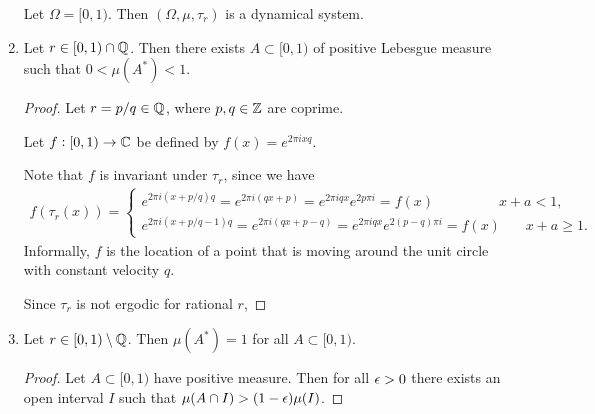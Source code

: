 \begin{enumerate}
    Let $\Omega = [0, 1)$. Then $(\Omega, \mu, \tau_r)$ is a dynamical system.


\item
  \begin{claim*}
    Let $r \in [0, 1) \cap \mathbb{Q}$. Then there exists $A \subset [0, 1)$ of positive Lebesgue measure such that $0 < \mu(A^*) < 1$.
  \end{claim*}
  \begin{proof}
    Let $r = p/q \in \mathbb{Q}$, where $p, q \in \mathbb{Z}$ are coprime.

    Let $f:[0, 1) \to \mathbb{C}$ be defined by $f(x) = e^{2\pi ixq}$.

    Note that $f$ is invariant under $\tau_r$, since we have
    \begin{align*}
      f(\tau_r(x)) =
      \begin{cases}
        e^{2\pi i (x + p/q)q} = e^{2\pi i (qx + p)} = e^{2\pi iqx}e^{2p\pi i} = f(x)  ~~~~~~~~~~~~~~~~~~~~~x + a < 1, \\
        e^{2\pi i (x + p/q - 1)q} = e^{2\pi i (qx + p - q)} = e^{2\pi iqx}e^{2(p - q)\pi i} = f(x)  ~~~~~~~~x + a \geq 1.
      \end{cases}
    \end{align*}
    Informally, $f$ is the location of a point that is moving around the unit circle with constant
    velocity $q$.

    Since $\tau_r$ is not ergodic for rational $r$,

  \end{proof}

\item
  \begin{claim*}
    Let $r \in [0, 1) \setminus \mathbb{Q}$. Then $\mu(A^*) = 1$ for all $A \subset [0, 1)$.
  \end{claim*}
  \begin{proof}

    Let $A \subset [0, 1)$ have positive measure. Then for all $\epsilon > 0$ there exists an open interval $I$
    such that $\mu(A \cap I) > (1 - \epsilon) \mu(I)$.

  \end{proof}
\end{enumerate}
